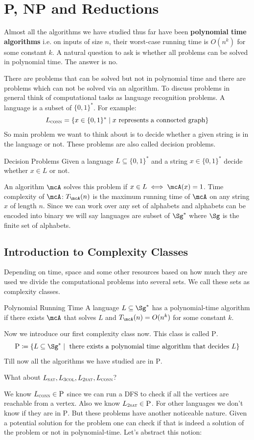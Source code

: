 \chapter{\textsc{P, NP} and Reductions}
Almost all the algorithms we have studied thus far have been \textbf{polynomial time algorithms} i.e. on inputs of size $n$, their worst-case running time is $O(n^k)$ for some constant $k$. A natural question to ask is whether all problems can be solved in polynomial time. The answer is no.

There are problems that can be solved but not in polynomial time and there are problems which can not be solved via an algorithm. To discuss problems in general think of computational tasks as language recognition problems. A language is a subset of $\{0,1\}^*$. For example: $$L_{\textsc{conn}}=\{x\in\{0,1\}^*\mid x\text{ represents a connected graph}\}$$So main problem we want to think about is to decide whether a given string is in the language or not. These problems are also called decision problems.
\begin{definition}{Decision Problems}{}
    Given a language $L\subseteq \{0,1\}^*$ and a string $x\in\{0,1\}^*$ decide whether $x\in L$ or not.
\end{definition}    An algorithm $\mcA$ solves this problem if $x\in L\iff \mcA(x)=1$. Time complexity of $\mcA$: $T_{\mcA}(n)$ is the maximum running time of $\mcA$ on any string $x$ of length $n$. Since we can work over any set of alphabets and alphabets can  be encoded into binary we will say languages are subset of $\Sg^*$ where $\Sg$ is the finite set of alphabets. 
\section{Introduction to Complexity Classes}
Depending on time, space and some other resources based on how much they are used we divide the computational problems into several sets. We call these sets as complexity classes.

\begin{Definition}{Polynomial Running Time}{}
    A language $L\subseteq\Sg^*$ has a polynomial-time algorithm if there exists $\mcA$ that solves $L$ and $T_{\mcA}(n)=O(n^k)$ for some constant $k$.
\end{Definition}
Now we introduce our first complexity class now. This class is called \textsc{P}. $$\textsc{P}\coloneqq \{L\subseteq \Sg^*\mid \text{ there exists a polynomial time algorithm that decides $L$}\}$$ Till now all the algorithms we have studied are in \textsc{P}.
\begin{question}{}{}
    What about $L_{\textsc{sat}}, L_{\textsc{3col}}, L_{\textsc{2sat}}, L_{\textsc{conn}}$?
\end{question}We know $L_{\textsc{conn}}\in \textsc{P}$ since we can run a \textsc{DFS} to check if all the vertices are reachable from a vertex. Also we know $L_{\textsc{2sat}}\in \textsc{P}$. For other languages we don't know if they are in \textsc{P}. But these problems have another noticeable nature. Given a potential solution for the problem one can check if that is indeed a solution of the problem or not in polynomial-time. Let's abstract this notion:

